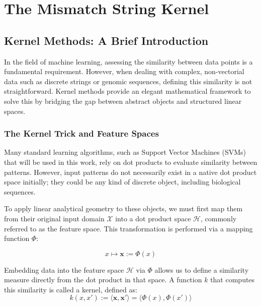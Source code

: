 \chapter{The Mismatch String Kernel}\label{ch:kernel}

\section{Kernel Methods: A Brief Introduction}\label{sec:kernel-intro}

In the field of machine learning, assessing the similarity between data points is a fundamental requirement. However, when dealing with complex, non-vectorial data such as discrete strings or genomic sequences, defining this similarity is not straightforward. Kernel methods provide an elegant mathematical framework to solve this by bridging the gap between abstract objects and structured linear spaces.

\subsection{The Kernel Trick and Feature Spaces}\label{sec:kernel-trick}

Many standard learning algorithms, such as Support Vector Machines (SVMs) that will be used in this work, rely on dot products to evaluate similarity between patterns. However, input patterns do not necessarily exist in a native dot product space initially; they could be any kind of discrete object, including biological sequences.

To apply linear analytical geometry to these objects, we must first map them from their original input domain $\mathcal{X}$ into a dot product space $\mathcal{H}$, commonly referred to as the feature space. This transformation is performed via a mapping function $\Phi$:

\begin{equation}\label{eq:feature-map}
x \mapsto \mathbf{x} := \Phi(x)
\end{equation}

\begin{definizione}\label{def:kernel}
Embedding data into the feature space $\mathcal{H}$ via $\Phi$ allows us to define a similarity measure directly from the dot product in that space. A function $k$ that computes this similarity is called a kernel, defined as:
\begin{equation}\label{eq:kernel-def}
k(x, x') := \langle \mathbf{x}, \mathbf{x'} \rangle = \langle \Phi(x), \Phi(x') \rangle
\end{equation}
\end{definizione}

